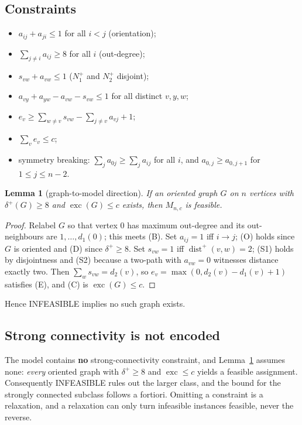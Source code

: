 \documentclass[11pt]{amsart}
\newtheorem{lemma}[theorem]{Lemma}
\theoremstyle{remark}
\newcommand{\exc}{\operatorname{exc}}
\begin{document}
\subsection*{Constraints}
\begin{itemize}
\item[(O)] $a_{ij} + a_{ji} \le 1$ for all $i < j$ \hfill (orientation);
\item[(D)] $\sum_{j \ne i} a_{ij} \ge 8$ for all $i$ \hfill (out-degree);
\item[(S1)] $s_{vw} + a_{vw} \le 1$ \hfill ($N_1^+$ and $N_2^+$ disjoint);
\item[(S2)] $a_{vy} + a_{yw} - a_{vw} - s_{vw} \le 1$ for all distinct
  $v, y, w$;
\item[(E)] $e_v \ge \sum_{w \ne v} s_{vw} - \sum_{j \ne v} a_{vj} + 1$;
\item[(C)] $\sum_v e_v \le c$;
\item[(B)] symmetry breaking: $\sum_j a_{0j} \ge \sum_j a_{ij}$ for all $i$,
  and $a_{0,j} \ge a_{0,j+1}$ for $1 \le j \le n-2$.
\end{itemize}

\begin{lemma}[graph-to-model direction]\label{lem:encoding}
If an oriented graph $G$ on $n$ vertices with $\delta^+(G) \ge 8$ and
$\exc(G) \le c$ exists, then $M_{n,c}$ is feasible.
\end{lemma}

\begin{proof}
Relabel $G$ so that vertex $0$ has maximum out-degree and its out-neighbours
are $1, \dots, d_1(0)$; this meets (B). Set $a_{ij} = 1$ iff $i \to j$; (O)
holds since $G$ is oriented and (D) since $\delta^+ \ge 8$. Set $s_{vw} = 1$
iff $\operatorname{dist}^+(v,w) = 2$; (S1) holds by disjointness and (S2)
because a two-path with $a_{vw} = 0$ witnesses distance exactly two. Then
$\sum_w s_{vw} = d_2(v)$, so $e_v = \max(0, d_2(v) - d_1(v) + 1)$ satisfies
(E), and (C) is $\exc(G) \le c$.
\end{proof}

Hence INFEASIBLE implies no such graph exists.

\subsection*{Strong connectivity is not encoded}
The model contains \textbf{no} strong-connectivity constraint, and
Lemma~\ref{lem:encoding} assumes none: \emph{every} oriented graph with
$\delta^+ \ge 8$ and $\exc \le c$ yields a feasible assignment. Consequently
INFEASIBLE rules out the larger class, and the bound for the strongly
connected subclass follows a fortiori. Omitting a constraint is a relaxation,
and a relaxation can only turn infeasible instances feasible, never the
reverse.
\end{document}
